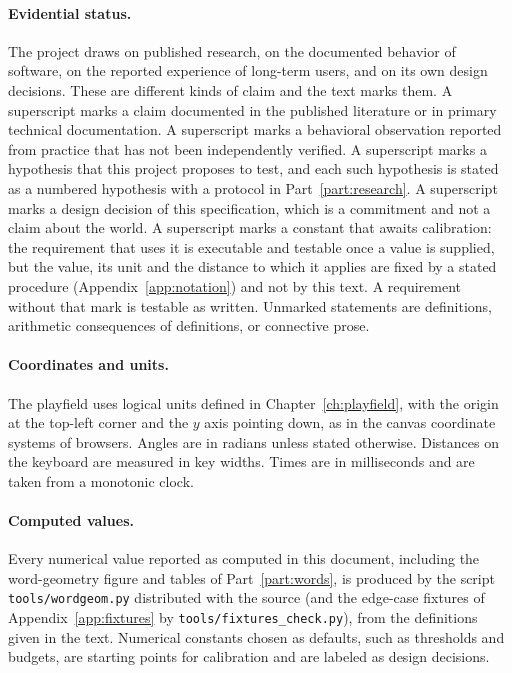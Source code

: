 \paragraph{Evidential status.} The project draws on published research, on the documented behavior of software, on the reported experience of long-term users, and on its own design decisions. These are different kinds of claim and the text marks them. A superscript \evD{} marks a claim documented in the published literature or in primary technical documentation. A superscript \evO{} marks a behavioral observation reported from practice that has not been independently verified. A superscript \evH{} marks a hypothesis that this project proposes to test, and each such hypothesis is stated as a numbered hypothesis with a protocol in Part~\ref{part:research}. A superscript \evS{} marks a design decision of this specification, which is a commitment and not a claim about the world. A superscript \evC{} marks a constant that awaits calibration: the requirement that uses it is executable and testable once a value is supplied, but the value, its unit and the distance to which it applies are fixed by a stated procedure (Appendix~\ref{app:notation}) and not by this text. A requirement without that mark is testable as written. Unmarked statements are definitions, arithmetic consequences of definitions, or connective prose.

\paragraph{Coordinates and units.} The playfield uses logical units defined in Chapter~\ref{ch:playfield}, with the origin at the top-left corner and the $y$ axis pointing down, as in the canvas coordinate systems of browsers. Angles are in radians unless stated otherwise. Distances on the keyboard are measured in key widths. Times are in milliseconds and are taken from a monotonic clock.

\paragraph{Computed values.} Every numerical value reported as computed in this document, including the word-geometry figure and tables of Part~\ref{part:words}, is produced by the script \texttt{tools/wordgeom.py} distributed with the source (and the edge-case fixtures of Appendix~\ref{app:fixtures} by \texttt{tools/fixtures\_check.py}), from the definitions given in the text. Numerical constants chosen as defaults, such as thresholds and budgets, are starting points for calibration and are labeled as design decisions.

